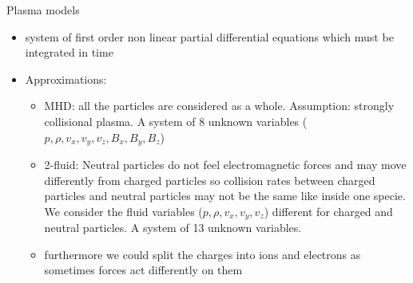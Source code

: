\documentclass{beamer}
\begin{document}
\begin{frame}{Plasma models}
\begin{itemize}
\item system of first order non linear partial differential equations which must be integrated in time
\item Approximations:
\begin{itemize}
\item MHD: all the particles are considered as a whole. Assumption: strongly collisional plasma. A system of 8 unknown variables
($p,\rho,v_x,v_y,v_z,B_x,B_y,B_z$)
\item 2-fluid: Neutral particles do not feel electromagnetic forces and may move  differently from charged particles so collision rates between 
charged particles and neutral particles may not be the same like inside one specie. 
We consider the fluid variables ($p,\rho,v_x,v_y,v_z$) different for charged and neutral particles. A system of 13 unknown variables.
\item furthermore we could split the charges into ions and electrons as sometimes forces act differently on them
\end{itemize}
\end{itemize}
\end{frame}
\end{document}
